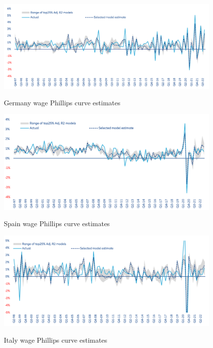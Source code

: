 \begin{figure}[H]
    \centering
    \caption{Germany wage Phillips curve estimates}
    \includegraphics[width=.95\textwidth]{Core/2.Labour/img/Germany25.png}
    \label{figure:ger25}
\end{figure}

\begin{figure}[H]
    \centering
    \caption{Spain wage Phillips curve estimates}
    \includegraphics[width=.95\textwidth]{Core/2.Labour/img/Spain25.png}
    \label{figure:sp25}
\end{figure}

\begin{figure}[H]
    \centering
    \caption{Italy wage Phillips curve estimates}
    \includegraphics[width=.95\textwidth]{Core/2.Labour/img/Italy25.png}
    \label{figure:it25}
\end{figure}

